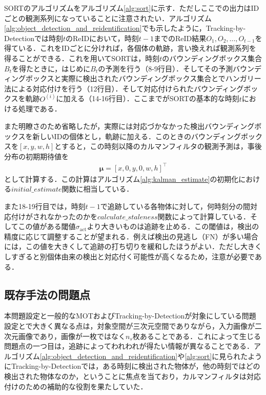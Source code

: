     SORTのアルゴリズムをアルゴリズム\ref{alg:sort}に示す．ただしここでの出力はIDごとの観測系列になっていることに注意されたい．アルゴリズム\ref{alg:object_detection_and_reidentification}でも示したように，Tracking-by-Detectionでは時刻$t$のReIDにおいて，時刻$t-1$までのReID結果$O_1, O_2, \dots, O_{t-1}$を得ている．これをIDごとに分ければ，各個体の軌跡，言い換えれば観測系列を得ることができる．これを用いてSORTは，時刻$t$のバウンディングボックス集合$B_t$を得たときに，はじめに$B_t$の予測を行う（8-9行目）．そしてその予測バウンディングボックスと実際に検出されたバウンディングボックス集合とでハンガリー法による対応付けを行う（12行目）．そして対応付けられたバウンディングボックスを軌跡$O^{(i)}$に加える（14-16行目）．ここまでがSORTの基本的な時刻$t$における処理である．
    
    また明瞭さのため省略したが，実際には対応づかなかった検出バウンディングボックスを新しいIDの個体とし，軌跡に加える．このときのバウンディングボックスを$[x,y,w,h]$とすると，この時刻以降のカルマンフィルタの観測予測は，事後分布の初期期待値を
    \begin{equation}
        \label{eq:SORT_kalman_initialize}
        \begin{aligned}
            \bm{\mu} = \left[x, 0, y, 0, w, h\right]^{\top}
        \end{aligned}
    \end{equation}
    として計算する．この計算はアルゴリズム\ref{alg:kalman_estimate}の初期化における$initial\_estimate$関数に相当している．

    また18-19行目では，時刻$t-1$で追跡している各物体に対して，何時刻分の間対応付けがされなかったのかを$calculate\_staleness$関数によって計算している．そしてこの値がある閾値$\sigma_{\text{act}}$より大きいものは追跡を止める．この閾値は，検出の精度に応じて調整することが望まれる．例えば検出の見逃し（FN）が多い場合には，この値を大きくして追跡の打ち切りを緩和したほうがよい．ただし大きくしすぎると別個体由来の検出と対応付く可能性が高くなるため，注意が必要である．

    \subsection{既存手法の問題点}
    \label{subsec:existing_problem}

    本問題設定と一般的なMOTおよびTracking-by-Detectionが対象にしている問題設定とで大きく異なる点は，対象空間が三次元空間でありながら，入力画像が二次元画像であり，画像が一枚ではなく$n_s$枚あることである．これによって生じる問題点の一つ目は，追跡によってわれわれが得たい情報が異なることである．アルゴリズム\ref{alg:object_detection_and_reidentification}や\ref{alg:sort}に見られたようにTracking-by-Detectionでは，ある時刻に検出された物体が，他の時刻ではどの検出された物体なのか，ということに焦点を当ており，カルマンフィルタは対応付けのための補助的な役割を果たしていた．

